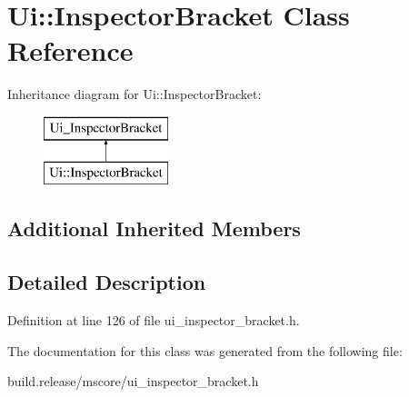 \hypertarget{class_ui_1_1_inspector_bracket}{}\section{Ui\+:\+:Inspector\+Bracket Class Reference}
\label{class_ui_1_1_inspector_bracket}
Inheritance diagram for Ui\+:\+:Inspector\+Bracket\+:\begin{figure}[H]
\begin{center}
\leavevmode
\includegraphics[height=2.000000cm]{class_ui_1_1_inspector_bracket}
\end{center}
\end{figure}
\subsection*{Additional Inherited Members}


\subsection{Detailed Description}


Definition at line 126 of file ui\+\_\+inspector\+\_\+bracket.\+h.



The documentation for this class was generated from the following file\+:\begin{DoxyCompactItemize}
\item 
build.\+release/mscore/ui\+\_\+inspector\+\_\+bracket.\+h\end{DoxyCompactItemize}
